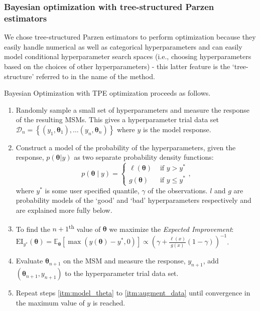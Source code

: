 \documentclass[journal=jacsat,manuscript=article]{achemso}
\begin{document}
\subsubsection{Bayesian optimization with tree-structured Parzen estimators}
We chose tree-structured Parzen estimators to perform optimization because they easily handle numerical as well as categorical hyperparameters and can easily model conditional hyperparameter search spaces (i.e., choosing hyperparameters based on the choices of other hyperparameters) - this latter feature is the `tree-structure' referred to in the name of the method. 

Bayesian Optimization with TPE optimization proceeds as follows. 
\begin{enumerate}
    \item Randomly sample a small set of hyperparameters and measure the response of the resulting MSMs. This gives a hyperparameter trial data set $\mathcal{D}_{n}=\left\{(y_1, \bm{\theta}_1),  \ldots (y_n, \bm{\theta}_n) \right \}$ where $y$ is the model response.
    \item Construct a model of the probability of the hyperparameters, given the response, $p(\bm{\theta}|y)$ as two separate probability density functions: 
    \begin{equation}
        p(\bm{\theta} \mid y)= \begin{cases}\ell(\bm{\theta}) & \text { if } y>y^* \\ g(\bm{\theta}) & \text { if } y \leq y^*\end{cases}, 
    \end{equation}
    where $y^{*}$ is some user specified quantile, $\gamma$ of the observations.  $l$ and $g$ are probability models of the `good' and `bad' hyperparameters respectively and are explained more fully below. \label{itm:model_theta} 
    \item To find the $n+1$\textsuperscript{th} value of $\bm{\theta}$ we maximize the \emph{Expected Improvement}: $\mathrm{EI}_{y^{*}}(\bm{\theta}) = \mathbb{E}_{\bm{\theta}}\left[\max{(y(\bm{\theta})-y^{*}, 0)} \right ]\propto\left(\gamma+\frac{\ell(x)}{g(x)}(1-\gamma)\right)^{-1}$.
    \item Evaluate $\bm{\theta}_{n+1}$ on the MSM and measure the response, $y_{n+1}$, add $\left( \bm{\theta}_{n+1}, y_{n+1}\right)$ to the hyperparameter trial data set. \label{itm:augment_data}
    \item Repeat steps \ref{itm:model_theta} to \ref{itm:augment_data} until convergence in the maximum value of $y$ is reached.   
    
\end{enumerate}
\end{document}
